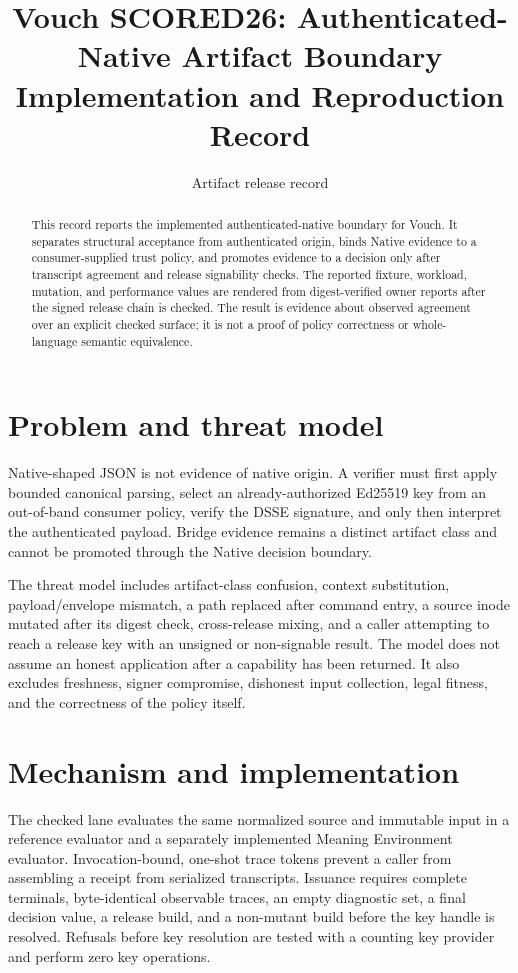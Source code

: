 \documentclass[10pt]{article}
\title{Vouch SCORED26: Authenticated-Native Artifact Boundary\\
  Implementation and Reproduction Record}
\author{Artifact release record}
\date{}
\begin{document}
\maketitle

\begin{abstract}
This record reports the implemented authenticated-native boundary for Vouch.
It separates structural acceptance from authenticated origin, binds Native
evidence to a consumer-supplied trust policy, and promotes evidence to a
decision only after transcript agreement and release signability checks.  The
reported fixture, workload, mutation, and performance values are rendered
from digest-verified owner reports after the signed release chain is checked.
The result is evidence about observed agreement over an explicit checked
surface; it is not a proof of policy correctness or whole-language semantic
equivalence.
\end{abstract}

\section{Problem and threat model}

Native-shaped JSON is not evidence of native origin.  A verifier must first
apply bounded canonical parsing, select an already-authorized Ed25519 key from
an out-of-band consumer policy, verify the DSSE signature, and only then
interpret the authenticated payload.  Bridge evidence remains a distinct
artifact class and cannot be promoted through the Native decision boundary.

The threat model includes artifact-class confusion, context substitution,
payload/envelope mismatch, a path replaced after command entry, a source inode
mutated after its digest check, cross-release mixing, and a caller attempting
to reach a release key with an unsigned or non-signable result.  The model does
not assume an honest application after a capability has been returned.  It
also excludes freshness, signer compromise, dishonest input collection, legal
fitness, and the correctness of the policy itself.

\section{Mechanism and implementation}

The checked lane evaluates the same normalized source and immutable input in a
reference evaluator and a separately implemented Meaning Environment
evaluator.  Invocation-bound, one-shot trace tokens prevent a caller from
assembling a receipt from serialized transcripts.  Issuance requires complete
terminals, byte-identical observable traces, an empty diagnostic set, a final
decision value, a release build, and a non-mutant build before the key handle
is resolved.  Refusals before key resolution are tested with a counting key
provider and perform zero key operations.
\end{document}
